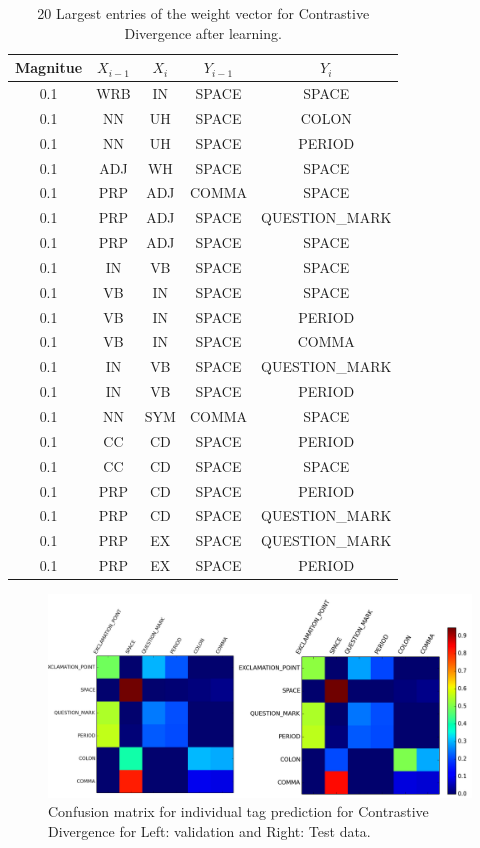 \documentclass[twoside,12pt]{article}
\begin{document}
\begin{table}[H]\footnotesize
  \caption{20 Largest entries of the weight vector  for Contrastive Divergence after learning.}
\begin{center}
    \begin{tabular}{| c | c | c | c | c |}
    \hline
    \textbf{ Magnitue} & $X_{i-1}$ & $X_i$ & $Y_{i-1}$& $Y_i$ \\ \hline
0.1& WRB& IN &SPACE& SPACE\\ \hline
0.1& NN &UH &SPACE &COLON\\ \hline
0.1& NN &UH &SPACE &PERIOD\\ \hline
0.1 &ADJ &WH &SPACE &SPACE\\ \hline
0.1 &PRP &ADJ &COMMA& SPACE\\ \hline
0.1 &PRP &ADJ &SPACE &QUESTION\_MARK\\ \hline
0.1 &PRP& ADJ &SPACE &SPACE\\ \hline
0.1 &IN &VB &SPACE &SPACE\\ \hline
0.1 &VB &IN &SPACE &SPACE\\ \hline
0.1 &VB &IN &SPACE &PERIOD\\ \hline
0.1 &VB &IN &SPACE &COMMA\\ \hline
0.1 &IN &VB &SPACE &QUESTION\_MARK\\ \hline
0.1 &IN &VB &SPACE &PERIOD\\ \hline
0.1 &NN &SYM &COMMA& SPACE\\ \hline
0.1 &CC &CD &SPACE &PERIOD\\ \hline
0.1 &CC &CD &SPACE &SPACE\\ \hline
0.1 &PRP &CD& SPACE &PERIOD\\ \hline
0.1 &PRP &CD &SPACE &QUESTION\_MARK\\ \hline
0.1 &PRP &EX &SPACE &QUESTION\_MARK\\ \hline
0.1 &PRP& EX &SPACE &PERIOD\\ \hline
    \end{tabular}
    \label{tableGibbsWeights}
\end{center}
\end{table}

\begin{figure}[H]
\centering
\includegraphics[width=1.\textwidth]{./figs/figGibbsConfMat.png}
\caption{Confusion matrix for individual tag prediction for Contrastive Divergence for Left: validation and Right: Test data.}
\label{figCDConf}
\end{figure}
\end{document}
